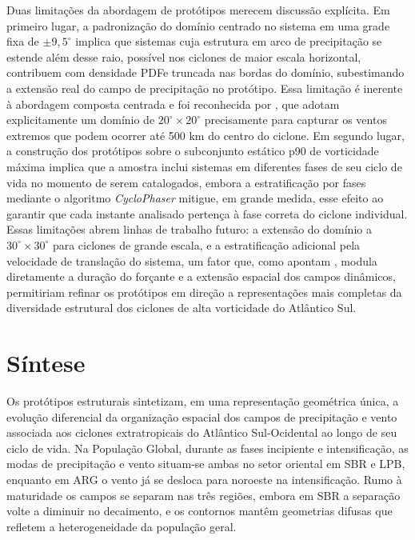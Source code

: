 
Duas limitações da abordagem de protótipos merecem discussão explícita. Em primeiro lugar, a padronização do domínio centrado no sistema em uma grade fixa de $\pm 9{,}5^{\circ}$ implica que sistemas cuja estrutura em arco de precipitação se estende além desse raio, possível nos ciclones de maior escala horizontal, contribuem com densidade PDFe truncada nas bordas do domínio, subestimando a extensão real do campo de precipitação no protótipo. Essa limitação é inerente à abordagem composta centrada e foi reconhecida por \citet{cardoso2022synoptic}, que adotam explicitamente um domínio de $20^{\circ} \times 20^{\circ}$ precisamente para capturar os ventos extremos que podem ocorrer até 500 km do centro do ciclone. Em segundo lugar, a construção dos protótipos sobre o subconjunto estático p90 de vorticidade máxima implica que a amostra inclui sistemas em diferentes fases de seu ciclo de vida no momento de serem catalogados, embora a estratificação por fases mediante o algoritmo \textit{CycloPhaser} \citep{deSouza2025CycloPhaser} mitigue, em grande medida, esse efeito ao garantir que cada instante analisado pertença à fase correta do ciclone individual. Essas limitações abrem linhas de trabalho futuro: a extensão do domínio a $30^{\circ} \times 30^{\circ}$ para ciclones de grande escala, e a estratificação adicional pela velocidade de translação do sistema, um fator que, como apontam \citet{gramcianinov2023impact}, modula diretamente a duração do forçante e a extensão espacial dos campos dinâmicos, permitiriam refinar os protótipos em direção a representações mais completas da diversidade estrutural dos ciclones de alta vorticidade do Atlântico Sul.

\section{Síntese}\label{sec:sintesis_prototipos}

Os protótipos estruturais sintetizam, em uma representação geométrica única, a evolução diferencial da organização espacial dos campos de precipitação e vento associada aos ciclones extratropicais do Atlântico Sul-Ocidental ao longo de seu ciclo de vida. Na População Global, durante as fases incipiente e intensificação, as modas de precipitação e vento situam-se ambas no setor oriental em SBR e LPB, enquanto em ARG o vento já se desloca para noroeste na intensificação. Rumo à maturidade os campos se separam nas três regiões, embora em SBR a separação volte a diminuir no decaimento, e os contornos mantêm geometrias difusas que refletem a heterogeneidade da população geral.

